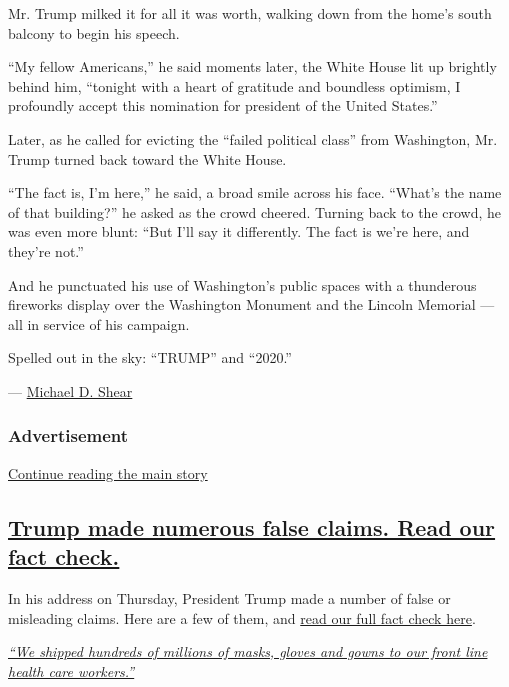 Mr. Trump milked it for all it was worth, walking down from the home's
south balcony to begin his speech.

``My fellow Americans,'' he said moments later, the White House lit up
brightly behind him, ``tonight with a heart of gratitude and boundless
optimism, I profoundly accept this nomination for president of the
United States.''

Later, as he called for evicting the ``failed political class'' from
Washington, Mr. Trump turned back toward the White House.

``The fact is, I'm here,'' he said, a broad smile across his face.
``What's the name of that building?'' he asked as the crowd cheered.
Turning back to the crowd, he was even more blunt: ``But I'll say it
differently. The fact is we're here, and they're not.''

And he punctuated his use of Washington's public spaces with a
thunderous fireworks display over the Washington Monument and the
Lincoln Memorial --- all in service of his campaign.

Spelled out in the sky: ``TRUMP'' and ``2020.''

--- \href{https://www.nytimes3xbfgragh.onion/by/michael-d-shear}{Michael
D. Shear}

\hypertarget{advertisement}{%
\subsubsection{Advertisement}\label{advertisement}}

\protect\hyperlink{after-dfp-ad-mid1}{Continue reading the main story}

\hypertarget{trump-made-numerous-false-claims-read-our-fact-check}{%
\subsection{\texorpdfstring{\protect\hyperlink{trump-made-numerous-false-claims-read-our-fact-check}{Trump
made numerous false claims. Read our fact
check.}}{Trump made numerous false claims. Read our fact check.}}\label{trump-made-numerous-false-claims-read-our-fact-check}}

In his address on Thursday, President Trump made a number of false or
misleading claims. Here are a few of them, and
\href{https://www.nytimes3xbfgragh.onion/live/2020/08/27/us/rnc-fact-check}{read
our full fact check here}.

\href{https://www.nytimes3xbfgragh.onion/live/2020/08/27/us/rnc-fact-check\#we-shipped-hundreds-of-millions-of-masks-gloves-and-gowns-to-our-front-line-health-care-workers}{\emph{``We
shipped hundreds of millions of masks, gloves and gowns to our front
line health care workers.''}}

